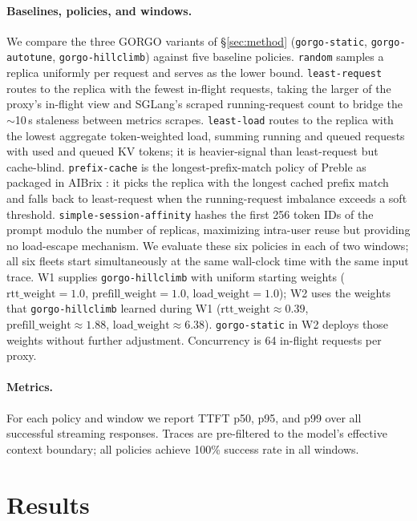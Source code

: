\documentclass{article}
\begin{document}
\paragraph{Baselines, policies, and windows.}
We compare the three GORGO variants of \S\ref{sec:method}
(\texttt{gorgo-static}, \texttt{gorgo-autotune}, \texttt{gorgo-hillclimb})
against five baseline policies. \texttt{random} samples a replica uniformly per
request and serves as the lower bound. \texttt{least-request} routes to the
replica with the fewest in-flight requests, taking the larger of the proxy's
in-flight view and SGLang's scraped running-request count to bridge the
$\sim$10\,s staleness between metrics scrapes. \texttt{least-load} routes to the
replica with the lowest aggregate token-weighted load, summing running and
queued requests with used and queued KV tokens; it is heavier-signal than
least-request but cache-blind. \texttt{prefix-cache} is the longest-prefix-match policy of Preble
\citep{preble} as packaged in AIBrix \citep{aibrix2024}: it picks the replica
with the longest cached prefix match and falls back to least-request when the
running-request imbalance exceeds a soft threshold. \texttt{simple-session-affinity}
hashes the first 256 token IDs of the prompt modulo the number of replicas,
maximizing intra-user reuse but providing no load-escape mechanism. We evaluate
these six policies in each of two windows; all six fleets start
simultaneously at the same wall-clock time with the same input trace. W1 supplies
\texttt{gorgo-hillclimb} with uniform starting weights
($\mathrm{rtt\_weight}{=}1.0$, $\mathrm{prefill\_weight}{=}1.0$,
$\mathrm{load\_weight}{=}1.0$); W2 uses the weights that
\texttt{gorgo-hillclimb} learned during W1
($\mathrm{rtt\_weight}{\approx}0.39$, $\mathrm{prefill\_weight}{\approx}1.88$,
$\mathrm{load\_weight}{\approx}6.38$). \texttt{gorgo-static} in W2 deploys those
weights without further adjustment. Concurrency is 64 in-flight requests per proxy.

\paragraph{Metrics.}
For each policy and window we report TTFT p50, p95, and p99 over all successful
streaming responses. Traces are pre-filtered to the model's effective context
boundary; all policies achieve 100\% success rate in all windows.

\section{Results}
\end{document}
